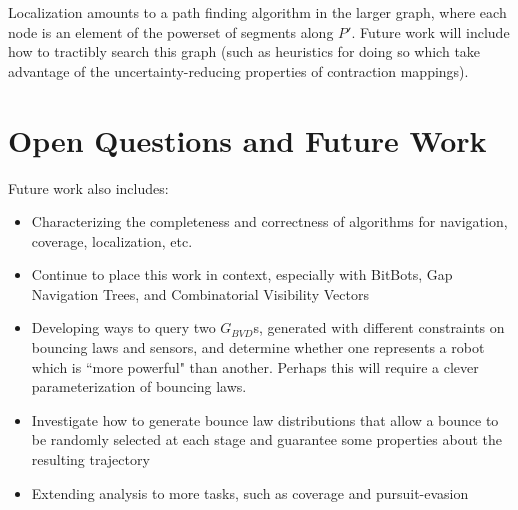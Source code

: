 \documentclass[]{styles/svproc}  %
\begin{document}
Localization amounts to a path finding algorithm in the larger graph, where each
node is an element of the powerset of segments along $P'$. Future work will
include how to tractibly search this graph (such as heuristics for doing so
which take advantage of the uncertainty-reducing properties of contraction
mappings).


\section{Open Questions and Future Work}

Future work also includes:

\begin{itemize}
\item Characterizing the completeness and correctness of algorithms for
navigation, coverage, localization, etc.
\item Continue to place this work in context, especially with BitBots, Gap
Navigation Trees, and Combinatorial Visibility Vectors
\item Developing ways to query two $G_{BVD}$s, generated with different constraints on
 bouncing laws and sensors, and determine whether one represents a robot which
is ``more powerful" than another. Perhaps this will require a clever
parameterization of bouncing laws.
\item Investigate how to generate bounce law distributions that allow a bounce
to be randomly selected at each stage and guarantee some properties about the
resulting trajectory
\item Extending analysis to more tasks, such as coverage and pursuit-evasion
\end{itemize}




\fi



\end{document}
